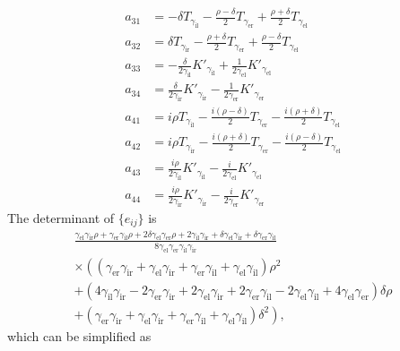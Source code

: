 \begin{align*}
  a_{31} &= -\delta T_{\gamma_\text{il}}-\frac{\rho-\delta}{2} T_{\gamma_\text{er}} + \frac{\rho+\delta}{2} T_{\gamma_\text{el}} \\
  a_{32} &= \delta T_{\gamma_\text{ir}}-\frac{\rho+\delta}{2} T_{\gamma_\text{er}}+ \frac{\rho-\delta}{2} T_{\gamma_\text{el}} \\
  a_{33} &= -\frac{\delta}{2 \gamma_\text{il}} K'_{\gamma_\text{il}} + \frac{1}{2 \gamma_\text{el}} K'_{\gamma_\text{el}} \\
  a_{34} &= \frac{\delta}{2 \gamma_\text{ir}} K'_{\gamma_\text{ir}} - \frac{1}{2 \gamma_\text{er}}K'_{\gamma_\text{er}} \\
  a_{41} &= i \rho T_{\gamma_\text{il}}- \frac{i(\rho-\delta)}{2} T_{\gamma_\text{er}} - \frac{i(\rho+\delta)}{2} T_{\gamma_\text{el}} \\
  a_{42} &= i \rho T_{\gamma_\text{ir}}-\frac{i(\rho+\delta)}{2} T_{\gamma_\text{er}}- \frac{i(\rho-\delta)}{2} T_{\gamma_\text{el}} \\
  a_{43} &= \frac{i \rho}{2 \gamma_\text{il}} K'_{\gamma_\text{il}} - \frac{i}{2 \gamma_\text{el}} K'_{\gamma_\text{el}} \\
  a_{44} &= \frac{i\rho}{2 \gamma_\text{ir}} K'_{\gamma_\text{ir}} - \frac{i}{2 \gamma_\text{er}} K'_{\gamma_\text{er}}
\end{align*}
The determinant of $\{e_{ij}\}$ is
\begin{multline*}
  \frac{\gamma_\text{el} \gamma_\text{ir} \rho+\gamma_\text{er} \gamma_\text{il} \rho+2 \delta \gamma_\text{el} \gamma_\text{er} \rho+2 \gamma_\text{il} \gamma_\text{ir}+\delta \gamma_\text{el} \gamma_\text{ir}+\delta \gamma_\text{er} \gamma_\text{il}}{8 \gamma_\text{el} \gamma_\text{er} \gamma_\text{il} \gamma_\text{ir}} \\ 
\times\left( (\gamma_\text{er} \gamma_\text{ir} +\gamma_\text{el} \gamma_\text{ir}+\gamma_\text{er} \gamma_\text{il} +\gamma_\text{el} \gamma_\text{il}) \rho^2\right.\\
  + (4 \gamma_\text{il} \gamma_\text{ir} - 2 \gamma_\text{er} \gamma_\text{ir} + 2 \gamma_\text{el} \gamma_\text{ir} + 2 \gamma_\text{er} \gamma_\text{il} - 2 \gamma_\text{el} \gamma_\text{il} + 4 \gamma_\text{el} \gamma_\text{er})\delta\rho \\ 
+ \left.(\gamma_\text{er} \gamma_\text{ir}+ \gamma_\text{el} \gamma_\text{ir} +  \gamma_\text{er} \gamma_\text{il}+ \gamma_\text{el} \gamma_\text{il})\delta^2\right),
\end{multline*}
which can be simplified as

